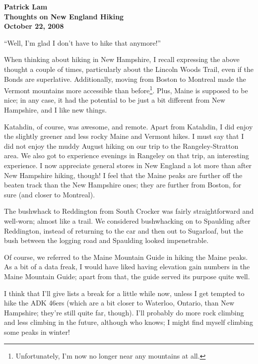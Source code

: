 \documentclass[11pt]{article}
\begin{document}
\thispagestyle{empty}

\begin{center}
\begin{large}
\textbf{Patrick Lam} \\
\textbf{Thoughts on New England Hiking} \\
\textbf{October 22, 2008}
\end{large}
\end{center}

``Well, I'm glad I don't have to hike that anymore!''

When thinking about hiking in New Hampshire, I recall expressing the
above thought a couple of times, particularly about the Lincoln Woods
Trail, even if the Bonds are superlative. Additionally, moving from
Boston to Montreal made the Vermont mountains more accessible than
before\footnote{Unfortunately, I'm now no longer near any mountains at
  all.}.  Plus, Maine is supposed to be nice; in any case, it had the
potential to be just a bit different from New Hampshire, and I like
new things.

Katahdin, of course, was awesome, and remote. Apart from Katahdin, I
did enjoy the slightly greener and less rocky Maine and Vermont
hikes. I must say that I did not enjoy the muddy August hiking on our
trip to the Rangeley-Stratton area. We also got to experience evenings
in Rangeley on that trip, an interesting experience. I now appreciate
general stores in New England a lot more than after New Hampshire
hiking, though! I feel that the Maine peaks are further off the beaten
track than the New Hampshire ones; they are further from Boston, for
sure (and closer to Montreal).

The bushwhack to Reddington from South Crocker was fairly
straightforward and well-worn; almost like a trail. We considered
bushwhacking on to Spaulding after Reddington, instead of returning to
the car and then out to Sugarloaf, but the bush between the logging
road and Spaulding looked impenetrable.

Of course, we referred to the Maine Mountain Guide in hiking the
Maine peaks. As a bit of a data freak, I would have liked having 
elevation gain numbers in the Maine Mountain Guide; apart from that,
the guide served its purpose quite well. 

\vspace*{1em}

I think that I'll give lists a break for a little while now, unless I
get tempted to hike the ADK 46ers (which are a bit closer to Waterloo,
Ontario, than New Hampshire; they're still quite far, though). I'll
probably do more rock climbing and less climbing in the future,
although who knows; I might find myself climbing some peaks in winter!
\end{document}
